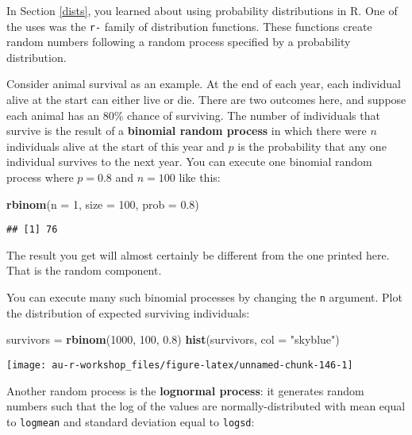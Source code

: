 \documentclass[]{book}
\newenvironment{Shaded}{\begin{snugshade}}{\end{snugshade}}
\newcommand{\KeywordTok}[1]{\textcolor[rgb]{0.13,0.29,0.53}{\textbf{#1}}}
\newcommand{\DataTypeTok}[1]{\textcolor[rgb]{0.13,0.29,0.53}{#1}}
\newcommand{\DecValTok}[1]{\textcolor[rgb]{0.00,0.00,0.81}{#1}}
\newcommand{\FloatTok}[1]{\textcolor[rgb]{0.00,0.00,0.81}{#1}}
\newcommand{\StringTok}[1]{\textcolor[rgb]{0.31,0.60,0.02}{#1}}
\newcommand{\NormalTok}[1]{#1}
\theoremstyle{definition}
\theoremstyle{definition}
\theoremstyle{definition}
\theoremstyle{remark}
\begin{document}
In Section \ref{dists}, you learned about using probability
distributions in R. One of the uses was the \texttt{r-} family of
distribution functions. These functions create random numbers following
a random process specified by a probability distribution.

Consider animal survival as an example. At the end of each year, each
individual alive at the start can either live or die. There are two
outcomes here, and suppose each animal has an 80\% chance of surviving.
The number of individuals that survive is the result of a
\textbf{binomial random process} in which there were \(n\) individuals
alive at the start of this year and \(p\) is the probability that any
one individual survives to the next year. You can execute one binomial
random process where \(p = 0.8\) and \(n = 100\) like this:

\begin{Shaded}
\begin{Highlighting}[]
\KeywordTok{rbinom}\NormalTok{(}\DataTypeTok{n =} \DecValTok{1}\NormalTok{, }\DataTypeTok{size =} \DecValTok{100}\NormalTok{, }\DataTypeTok{prob =} \FloatTok{0.8}\NormalTok{)}
\end{Highlighting}
\end{Shaded}

\begin{verbatim}
## [1] 76
\end{verbatim}

The result you get will almost certainly be different from the one
printed here. That is the random component.

You can execute many such binomial processes by changing the \texttt{n}
argument. Plot the distribution of expected surviving individuals:

\begin{Shaded}
\begin{Highlighting}[]
\NormalTok{survivors =}\StringTok{ }\KeywordTok{rbinom}\NormalTok{(}\DecValTok{1000}\NormalTok{, }\DecValTok{100}\NormalTok{, }\FloatTok{0.8}\NormalTok{)}
\KeywordTok{hist}\NormalTok{(survivors, }\DataTypeTok{col =} \StringTok{"skyblue"}\NormalTok{)}
\end{Highlighting}
\end{Shaded}

\begin{center}\texttt{[image: au-r-workshop\_files/figure-latex/unnamed-chunk-146-1]} \end{center}

Another random process is the \textbf{lognormal process}: it generates
random numbers such that the log of the values are normally-distributed
with mean equal to \texttt{logmean} and standard deviation equal to
\texttt{logsd}:
\end{document}
